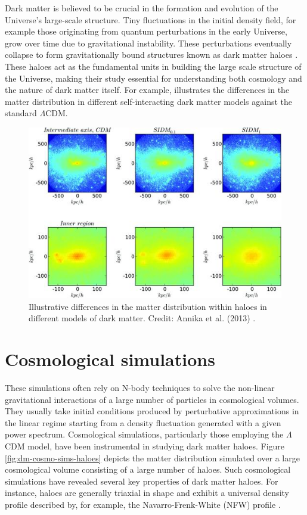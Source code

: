 Dark matter is believed to be crucial in the formation and evolution of the Universe's large-scale structure. Tiny fluctuations in the initial density field, for example those originating from quantum perturbations in the early Universe, grow over time due to gravitational instability. These perturbations eventually collapse to form gravitationally bound structures known as dark matter haloes \citep[][]{1974ApJ...187..425P,2002PhR...372....1C}. These haloes act as the fundamental units in building the large scale structure of the Universe, making their study essential for understanding both cosmology and the nature of dark matter itself. For example,  illustrates the differences in the matter distribution in different self-interacting dark matter models against the standard $\Lambda$CDM.

\begin{figure}
    \centering
    \includegraphics[width=0.8\linewidth]{Figures/dm-models-halo-illus.jpeg}
    \caption{Illustrative differences in the matter distribution within haloes in different models of dark matter. Credit: Annika et al. (2013) \citep{2013MNRAS.430..105P}.}
    \label{fig:dm-models-haloes}
\end{figure}

\section{Cosmological simulations}

These simulations often rely on N-body techniques to solve the non-linear gravitational interactions of a large number of particles in cosmological volumes. They usually take initial conditions produced by perturbative approximations in the linear regime starting from a density fluctuation generated with a given power spectrum. Cosmological simulations, particularly those employing the $\Lambda$CDM model, have been instrumental in studying dark matter haloes. Figure \ref{fig:dm-cosmo-sims-haloes} depicts the matter distribution simulated over a large cosmological volume consisting of a large number of haloes. Such cosmological simulations have revealed several key properties of dark matter haloes. For instance, haloes are generally triaxial in shape \citep[][]{1988ApJ...327..507F} and exhibit a universal density profile described by, for example, the Navarro-Frenk-White (NFW) profile \citep{1996ApJ...462..563N,1997ApJ...490..493N,2010MNRAS.402...21N}.

